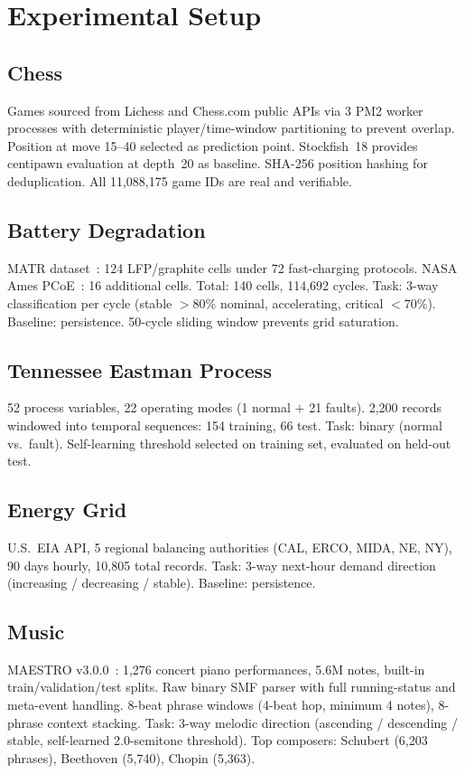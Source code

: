 \documentclass[12pt,a4paper]{article}
\begin{document}
\section{Experimental Setup}

\subsection{Chess}
Games sourced from Lichess and Chess.com public APIs via 3 PM2 worker processes with
deterministic player/time-window partitioning to prevent overlap. Position at move 15--40
selected as prediction point. Stockfish~18 provides centipawn evaluation at depth~20 as baseline.
SHA-256 position hashing for deduplication. All 11,088,175 game IDs are real and verifiable.

\subsection{Battery Degradation}
MATR dataset~\cite{severson2019}: 124 LFP/graphite cells under 72 fast-charging protocols. NASA
Ames PCoE~\cite{nasa2007}: 16 additional cells. Total: 140 cells, 114,692 cycles. Task: 3-way
classification per cycle (stable $>$80\% nominal, accelerating, critical $<$70\%). Baseline:
persistence. 50-cycle sliding window prevents grid saturation.

\subsection{Tennessee Eastman Process}
52 process variables, 22 operating modes (1 normal $+$ 21 faults). 2,200 records windowed into
temporal sequences: 154 training, 66 test. Task: binary (normal vs.\ fault). Self-learning
threshold selected on training set, evaluated on held-out test.

\subsection{Energy Grid}
U.S.\ EIA API, 5 regional balancing authorities (CAL, ERCO, MIDA, NE, NY), 90 days hourly,
10,805 total records. Task: 3-way next-hour demand direction (increasing / decreasing / stable).
Baseline: persistence.

\subsection{Music}
MAESTRO v3.0.0~\cite{maestro2019}: 1,276 concert piano performances, 5.6M notes, built-in
train/validation/test splits. Raw binary SMF parser with full running-status and meta-event
handling. 8-beat phrase windows (4-beat hop, minimum 4 notes), 8-phrase context stacking. Task:
3-way melodic direction (ascending / descending / stable, self-learned 2.0-semitone threshold).
Top composers: Schubert (6,203 phrases), Beethoven (5,740), Chopin (5,363).
\end{document}
